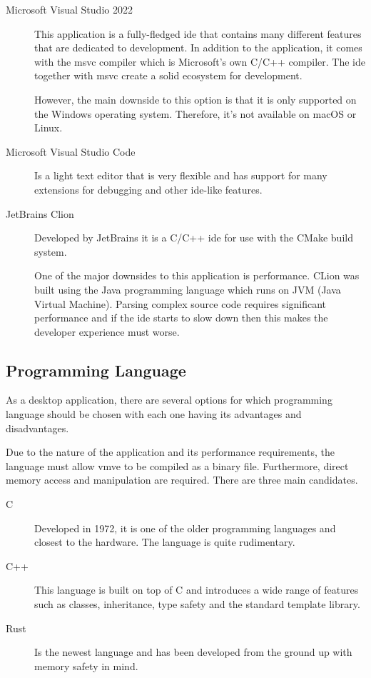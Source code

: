 \documentclass[11pt]{article}
\begin{document}
\begin{description}
  \item[Microsoft Visual Studio 2022] This application is a fully-fledged
  \gls*{ide} that contains many different features that are dedicated to
  development. In addition to the application, it comes with the \gls*{msvc}
  compiler which is Microsoft's own C/C++ compiler. The \gls*{ide} together with
  \gls*{msvc} create a solid ecosystem for development.

  However, the main downside to this option is that it is only supported on the
  Windows operating system. Therefore, it's not available on macOS or Linux.

  \item[Microsoft Visual Studio Code] Is a light text editor that is very flexible and has support for
  many extensions for debugging and other ide-like features.
  
  \item[JetBrains Clion] Developed by JetBrains it is a C/C++ \gls*{ide} for use with the
    CMake build system. 

  One of the major downsides to this application is performance. CLion was built
  using the Java programming language which runs on JVM (Java Virtual Machine).
  Parsing complex source code requires significant performance and if the
  \gls*{ide} starts to slow down then this makes the developer experience must
  worse.
\end{description}

\subsection{Programming Language}
As a desktop application, there are several options for which programming
language should be chosen with each one having its advantages and disadvantages.

Due to the nature of the application and its performance requirements, the
language must allow \gls*{vmve} to be compiled as a binary file. Furthermore,
direct memory access and manipulation are required. There are three main
candidates.

\begin{description}
  \item[C] Developed in 1972, it is one of the older programming languages and
  closest to the hardware. The language is quite rudimentary.
  \item[C++] This language is built on top of C and introduces a wide range of
    features such as classes, inheritance, type safety and the standard template
    library. 
  \item[Rust] Is the newest language and has been developed from the ground up
    with memory safety in mind. 
\end{description}
\end{document}
